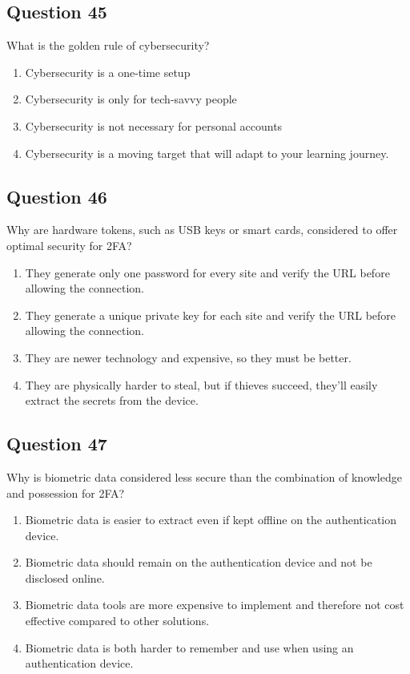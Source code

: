 \documentclass[12pt,a4paper]{article}
\begin{document}
\bigskip


\subsection*{Question 45}
What is the golden rule of cybersecurity?

\begin{enumerate}[label=\Alph*., leftmargin=*]
\item Cybersecurity is a one-time setup
\item Cybersecurity is only for tech-savvy people
\item Cybersecurity is not necessary for personal accounts
\item Cybersecurity is a moving target that will adapt to your learning journey.
\end{enumerate}

\bigskip


\subsection*{Question 46}
Why are hardware tokens, such as USB keys or smart cards, considered to offer optimal security for 2FA?

\begin{enumerate}[label=\Alph*., leftmargin=*]
\item They generate only one password for every site and verify the URL before allowing the connection.
\item They generate a unique private key for each site and verify the URL before allowing the connection.
\item They are newer technology and expensive, so they must be better.
\item They are physically harder to steal, but if thieves succeed, they'll easily extract the secrets from the device.
\end{enumerate}

\bigskip


\subsection*{Question 47}
Why is biometric data considered less secure than the combination of knowledge and possession for 2FA?

\begin{enumerate}[label=\Alph*., leftmargin=*]
\item Biometric data is easier to extract even if kept offline on the authentication device.
\item Biometric data should remain on the authentication device and not be disclosed online.
\item Biometric data tools are more expensive to implement and therefore not cost effective compared to other solutions.
\item Biometric data is both harder to remember and use when using an authentication device.
\end{enumerate}
\end{document}
